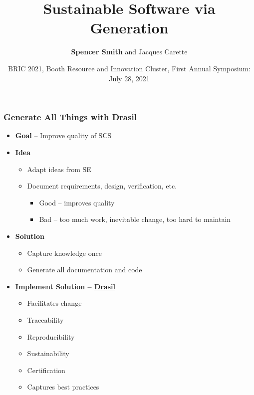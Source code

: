 \documentclass{beamer}
\title {Sustainable Software via Generation}
\author{\textbf{Spencer Smith} and Jacques Carette}
\institute[McMaster University]
{
  Computing and Software Department\\
  Faculty of Engineering\\
  McMaster University
}
\date {BRIC 2021, Booth Resource and Innovation Cluster, First Annual Symposium:
  July 28, 2021}
\begin{document}

\begin{frame}[plain]

\titlepage

\end{frame}


\begin{frame}

\frametitle{Generate All Things with Drasil}

\begin{itemize}
\item \textbf{Goal} -- Improve quality of SCS
\item \textbf{Idea}
  \begin{itemize}
  \item Adapt ideas from SE
  \item Document requirements, design, verification, etc.
    \begin{itemize}
    \item Good -- improves quality
    \item Bad -- too much work, inevitable change, too hard to maintain
    \end{itemize}
  \end{itemize}
\item \textbf{Solution}
\begin{itemize}
\item Capture knowledge once
\item Generate all documentation and code
\end{itemize}
\item \textbf{Implement Solution --
    \href{https://github.com/JacquesCarette/Drasil} {Drasil}}
  \begin{itemize}
  \item Facilitates change
  \item Traceability
  \item Reproducibility
  \item Sustainability
  \item Certification
  \item Captures best practices
  \end{itemize}
\end{itemize}

\end{frame}
\end{document}
